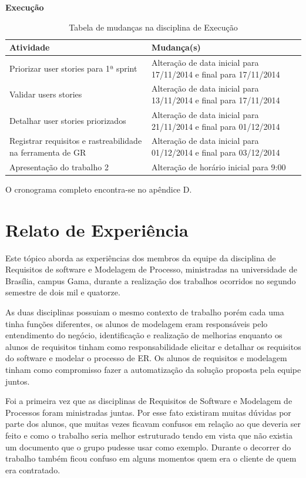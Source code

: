 \textbf{Execução}
\begin{table}[H]
\caption{Tabela de mudanças na disciplina de Execução}
\centering
\begin{tabular}{ | p{3cm} | p{9cm}| }
\hline
\textbf{Atividade } & \textbf{Mudança(s)}\\ \hline
Priorizar user stories para 1ª sprint & Alteração de data inicial para 17/11/2014 e final para 17/11/2014 \\ \hline
Validar users stories & Alteração de data inicial para 13/11/2014 e final para 17/11/2014 \\ \hline
Detalhar user stories priorizados & Alteração de data inicial para 21/11/2014 e final para 01/12/2014\\ \hline
Registrar requisitos e rastreabilidade na ferramenta de GR & Alteração de data inicial para 01/12/2014 e final para 03/12/2014\\ \hline
Apresentação do trabalho 2 & Alteração de horário inicial para 9:00 \\ \hline
\end{tabular}
\end{table}

O cronograma completo encontra-se no apêndice D.

\section{Relato de Experiência}
Este tópico aborda as experiências dos membros da equipe da disciplina de Requisitos de software e Modelagem de Processo, ministradas na universidade de Brasília, campus Gama,  durante a realização dos trabalhos ocorridos no segundo semestre de dois mil e quatorze.

As duas disciplinas possuiam  o mesmo contexto de trabalho porém cada uma tinha funções diferentes, os alunos de modelagem eram responsáveis pelo entendimento do negócio, identificação e realização de melhorias enquanto os alunos de requisitos tinham como responsabilidade elicitar e detalhar os requisitos do software e modelar o processo de ER. Os alunos de requisitos e modelagem tinham como compromisso fazer  a  automatização da solução proposta pela equipe juntos.

Foi a primeira vez que as disciplinas de Requisitos de Software e Modelagem de Processos foram ministradas juntas. Por esse fato existiram muitas dúvidas por parte dos alunos, que muitas vezes ficavam confusos em relação ao que deveria ser feito e como o trabalho seria melhor estruturado tendo em vista que não existia um documento que o grupo pudesse usar como exemplo. Durante o decorrer do trabalho também ficou confuso em alguns momentos quem era o cliente de quem  era contratado.

